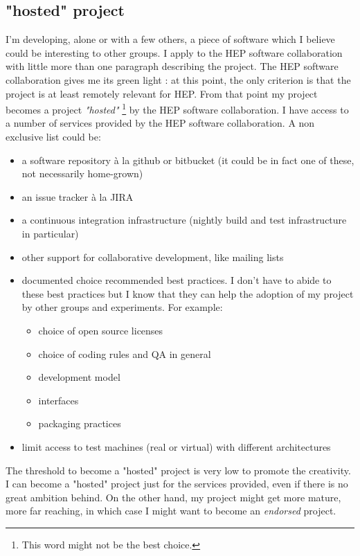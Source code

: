 \documentclass[11pt]{article} %
\begin{document}
\subsection{"hosted" project }
I'm developing, alone or with a few others, a piece of software which I believe could be interesting to other groups. I apply to the HEP software collaboration with little more than one paragraph describing the project. The HEP software collaboration gives me its green light : at this point, the only criterion is that the project is at least remotely relevant for HEP. From that point my project becomes a project {\em "hosted"} \footnote{This word might not be the best choice.} by the HEP software collaboration. I have access to a number of services provided by the HEP software collaboration. A non exclusive list could be:
\begin{itemize}
\item a software repository à la github or bitbucket (it could be in fact one of these, not necessarily home-grown)
\item an issue tracker à la JIRA
\item a continuous integration infrastructure (nightly build and test infrastructure in particular)
\item other support for collaborative development, like mailing lists
\item documented choice recommended best practices. I don't have to abide to these best practices but I know that they can help the adoption of my project by other groups and experiments. For example:
\begin{itemize}
\item choice of open source licenses
\item choice of coding rules and QA in general
\item development model
\item interfaces
\item packaging practices
\end{itemize}

\item limit access to test machines (real or virtual) with different architectures
\end{itemize}

The threshold to become a "hosted" project is very low to promote the creativity. I can become a "hosted" project just for the services provided, even if there is no great ambition behind. On the other hand, my project might get more mature, more far reaching, in which case I might want to become an {\em endorsed} project.
\end{document}
